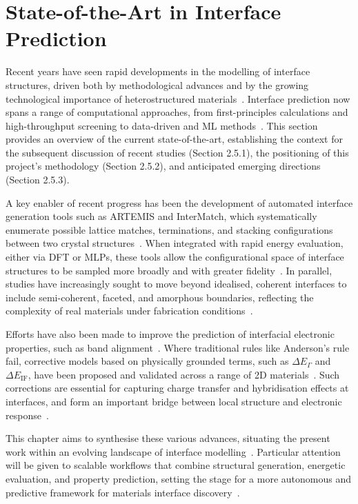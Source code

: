 \newpage \section{State-of-the-Art in Interface Prediction} \label{section:state_of_the_art}

Recent years have seen rapid developments in the modelling of interface structures, driven both by methodological advances and by the growing technological importance of heterostructured materials~\cite{Butler2019-ws, Gerber2023-yd, Khot2025-hh}.
Interface prediction now spans a range of computational approaches, from first-principles calculations and high-throughput screening to data-driven and ML methods~\cite{Pyzer-Knapp2025-uq, Khot2025-hh}.
This section provides an overview of the current state-of-the-art, establishing the context for the subsequent discussion of recent studies (Section 2.5.1), the positioning of this project's methodology (Section 2.5.2), and anticipated emerging directions (Section 2.5.3).

A key enabler of recent progress has been the development of automated interface generation tools such as ARTEMIS and InterMatch, which systematically enumerate possible lattice matches, terminations, and stacking configurations between two crystal structures~\nocite{}.
When integrated with rapid energy evaluation, either via DFT or MLPs, these tools allow the configurational space of interface structures to be sampled more broadly and with greater fidelity~\cite{artemis_paper, Gerber2023-yd}.
In parallel, studies have increasingly sought to move beyond idealised, coherent interfaces to include semi-coherent, faceted, and amorphous boundaries, reflecting the complexity of real materials under fabrication conditions~\cite{Davies2024-ju, Peschel2024-et, Khot2025-hh}.

Efforts have also been made to improve the prediction of interfacial electronic properties, such as band alignment~\nocite{}.
Where traditional rules like Anderson's rule fail, corrective models based on physically grounded terms, such as $\Delta E_{\Gamma}$ and $\Delta E_{\mathrm{IF}}$, have been proposed and validated across a range of 2D materials~\cite{Davies2024-ju}.
Such corrections are essential for capturing charge transfer and hybridisation effects at interfaces, and form an important bridge between local structure and electronic response~\nocite{}.

This chapter aims to synthesise these various advances, situating the present work within an evolving landscape of interface modelling~\nocite{}.
Particular attention will be given to scalable workflows that combine structural generation, energetic evaluation, and property prediction, setting the stage for a more autonomous and predictive framework for materials interface discovery~\nocite{}.

